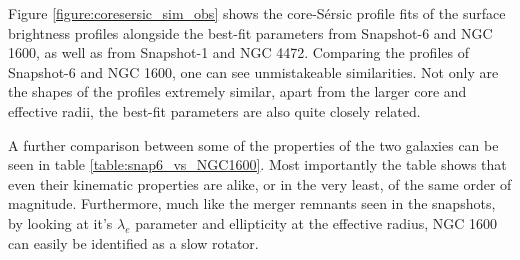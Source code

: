 \documentclass[english, oneside]{HYgradu}
\begin{document}
Figure \ref{figure:coresersic_sim_obs} shows the core-Sérsic profile fits of the surface brightness profiles alongside the best-fit parameters from Snapshot-6 and NGC 1600, as well as from Snapshot-1 and NGC 4472. Comparing the profiles of Snapshot-6 and NGC 1600, one can see unmistakeable similarities. Not only are the shapes of the profiles extremely similar, apart from the larger core and effective radii, the best-fit parameters are also quite closely related.

A further comparison between some of the properties of the two galaxies can be seen in table \ref{table:snap6_vs_NGC1600}. Most importantly the table shows that even their kinematic properties are alike, or in the very least, of the same order of magnitude. Furthermore, much like the merger remnants seen in the snapshots, by looking at it's $\lambda_e$ parameter and ellipticity at the effective radius, NGC 1600 can easily be identified as a slow rotator.
\end{document}

